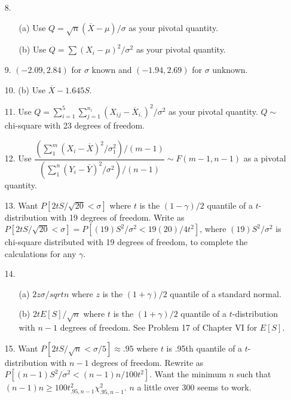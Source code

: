 \begin{enumerate}
	\item[8.] \begin{enumerate}
		\item[(a)] Use $Q=\sqrt{n}(\overline{X}-\mu)/\sigma$ as your pivotal quantity.
		\item[(b)] Use $Q= \sum(X_i-\mu)^2/\sigma^2$ as your pivotal quantity.
	\end{enumerate}

	\newpage
	
	\item[9.] $(-2.09, 2.84)$ for $\sigma$ known and $(-1.94,2.69)$ for $\sigma$ unknown.
	
	\item[10.] (b) Use $\overline{X} - 1.645S$.
	
	\item[11.] Use $Q = \sum\limits_{i=1}^5\sum\limits_{j=1}^{n_i}(X_{ij}-\overline{X}_{i.})^2/\sigma^2$ as your pivotal quantity. $Q\sim$ chi-square with 23 degrees of freedom.
	
	\item[12.] Use $\dfrac{\left(\sum\limits_1^m(X_i-\overline{X})^2/\sigma_1^2\right)/(m-1)}{\left(\sum\limits_1^n(Y_i-\overline{Y})^2/\sigma^2\right)/(n-1)} \sim F(m-1,n-1)$ as a pivotal quantity. 
	
	\item[13.] Want $P[2tS/\sqrt{20} < \sigma]$ where $t$ is the $(1-\gamma)/2$ quantile of a $t$-distribution with 19 degrees of freedom. Write as $P[2tS/\sqrt{20} < \sigma] = P[(19)S^2/\sigma^2 < 19(20)/4t^2]$, where $(19)S^2/\sigma^2$ is chi-square distributed with 19 degrees of freedom, to complete the calculations for any $\gamma$.
	
	\item[14.] \begin{enumerate}
		\item[(a)] $2z\sigma/sqrt{n}$ where $z$ is the $(1+\gamma)/2$ quantile of a standard normal.
		\item[(b)] $2tE[S]/\sqrt{n}$ where $t$ is the $(1+\gamma)/2$ quantile of a $t$-distribution with $n-1$ degrees of freedom. See Problem 17 of Chapter VI for $E[S]$.
	\end{enumerate}
	
	\item[15.] Want $P[2tS/\sqrt{n} < \sigma/5] \approx .95$ where $t$ is .95th quantile of a $t$-distribution with $n-1$ degrees of freedom. Rewrite as $P[(n-1)S^2/\sigma^2 < (n-1)n/100t^2]$. Want the minimum $n$ such that $(n-1)n \ge 100t^2_{.95,n-1}\chi^2_{.95,n-1}$. $n$ a little over 300 seems to work.


\end{enumerate}
